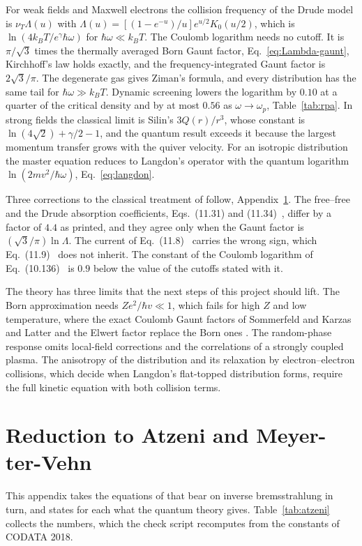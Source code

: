 \documentclass[11pt]{article}
\numberwithin{equation}{section}
\newcommand{\nuT}{\nu_T}
\newcommand{\kB}{k_B}
\begin{document}
For weak fields and Maxwell electrons the collision frequency of the Drude
model is $\nuT\Lambda(u)$ with
$\Lambda(u)=[(1-e^{-u})/u]e^{u/2}K_0(u/2)$, which is
$\ln(4\kB T/e^\gamma\hbar\omega)$ for $\hbar\omega\ll\kB T$. The Coulomb
logarithm needs no cutoff. It is $\pi/\sqrt3$ times the thermally averaged
Born Gaunt factor, Eq.~\eqref{eq:Lambda-gaunt}, Kirchhoff's law holds exactly,
and the frequency-integrated Gaunt factor is $2\sqrt3/\pi$. The degenerate
gas gives Ziman's formula, and every distribution has the same tail for
$\hbar\omega\gg\kB T$. Dynamic screening lowers the logarithm by $0.10$ at a
quarter of the critical density and by at most $0.56$ as $\omega\to\omega_p$,
Table~\ref{tab:rpa}. In strong fields the
classical limit is Silin's $3Q(r)/r^3$, whose constant is
$\ln(4\sqrt2)+\gamma/2-1$, and the quantum result exceeds it because the
largest momentum transfer grows with the quiver velocity. For an isotropic
distribution the master equation reduces to Langdon's operator with the
quantum logarithm $\ln(2mv^2/\hbar\omega)$, Eq.~\eqref{eq:langdon}.

Three corrections to the classical treatment of \cite{Atzeni2004} follow,
Appendix~\ref{app:atzeni}. The free--free and the Drude absorption
coefficients, Eqs.~(11.31) and (11.34)~\cite{Atzeni2004}, differ by a factor of
$4.4$ as printed, and they agree only when the Gaunt factor is
$(\sqrt3/\pi)\ln\Lambda$. The current of Eq.~(11.8)~\cite{Atzeni2004} carries
the wrong sign, which Eq.~(11.9)~\cite{Atzeni2004} does not inherit. The constant of the
Coulomb logarithm of Eq.~(10.136)~\cite{Atzeni2004} is $0.9$ below the value of
the cutoffs stated with it.

The theory has three limits that the next steps of this project should lift.
The Born approximation needs $Ze^2/\hbar v\ll1$, which fails for high $Z$ and
low temperature, where the exact Coulomb Gaunt factors of Sommerfeld
\cite{Sommerfeld1931} and Karzas and Latter \cite{KarzasLatter1961} and the
Elwert factor \cite{Elwert1939} replace the Born ones \cite{Moll2012}. The
random-phase response omits local-field corrections and the correlations of a
strongly coupled plasma. The anisotropy of the distribution and its relaxation
by electron--electron collisions, which decide when Langdon's flat-topped
distribution forms, require the full kinetic equation with both collision
terms.


\appendix
\section{Reduction to Atzeni and Meyer-ter-Vehn}
\label{app:atzeni}
This appendix takes the equations of \cite{Atzeni2004} that bear on inverse
bremsstrahlung in turn, and states for each what the quantum theory gives.
Table~\ref{tab:atzeni} collects the numbers, which the check script
recomputes from the constants of CODATA 2018.
\end{document}
